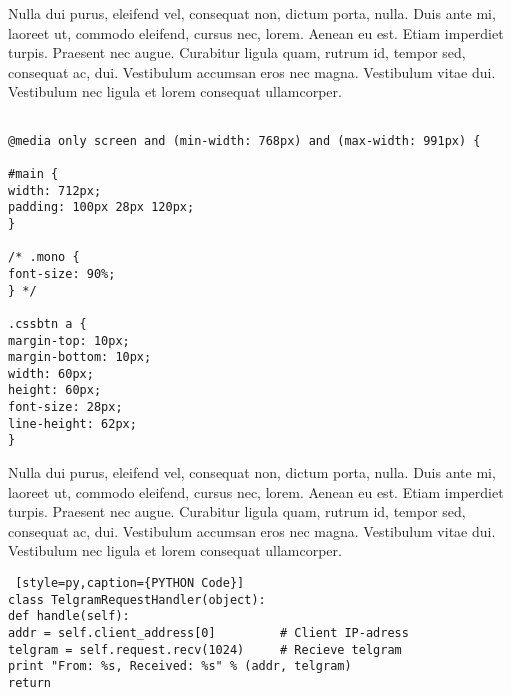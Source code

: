 Nulla dui purus, eleifend vel, consequat non, dictum porta, nulla. Duis ante mi, laoreet ut, commodo eleifend, cursus nec, lorem. Aenean eu est. Etiam imperdiet turpis. Praesent nec augue. Curabitur ligula quam, rutrum id, tempor sed, consequat ac, dui. Vestibulum accumsan eros nec magna. Vestibulum vitae dui. Vestibulum nec ligula et lorem consequat ullamcorper.

\begin{lstlisting}[style=htmlcssjs,caption={HTML CSS Javascript Code}]

@media only screen and (min-width: 768px) and (max-width: 991px) {

#main {
width: 712px;
padding: 100px 28px 120px;
}

/* .mono {
font-size: 90%;
} */

.cssbtn a {
margin-top: 10px;
margin-bottom: 10px;
width: 60px;  
height: 60px;   
font-size: 28px;
line-height: 62px;
}
\end{lstlisting}

Nulla dui purus, eleifend vel, consequat non, dictum porta, nulla. Duis ante mi, laoreet ut, commodo eleifend, cursus nec, lorem. Aenean eu est. Etiam imperdiet turpis. Praesent nec augue. Curabitur ligula quam, rutrum id, tempor sed, consequat ac, dui. Vestibulum accumsan eros nec magna. Vestibulum vitae dui. Vestibulum nec ligula et lorem consequat ullamcorper.

\begin{lstlisting} [style=py,caption={PYTHON Code}]
class TelgramRequestHandler(object):
def handle(self):
addr = self.client_address[0]         # Client IP-adress
telgram = self.request.recv(1024)     # Recieve telgram
print "From: %s, Received: %s" % (addr, telgram)
return
\end{lstlisting}